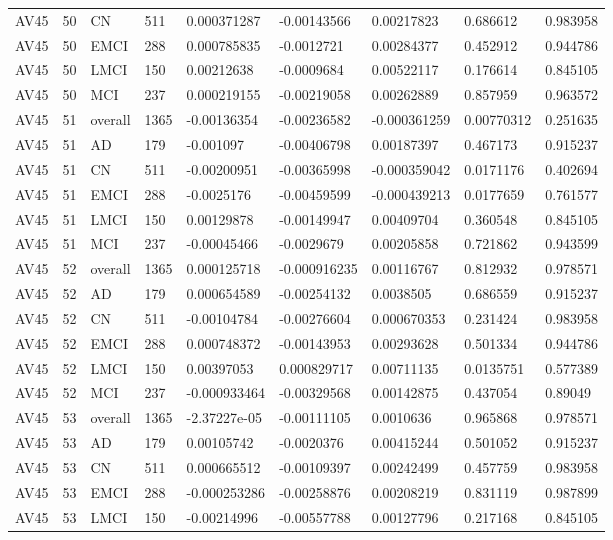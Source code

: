 \begin{landscape}
\begin{longtable}{lllllllll}
AV45 & 50 & CN & 511 & 0.000371287 & -0.00143566 & 0.00217823 & 0.686612 & 0.983958 \\
AV45 & 50 & EMCI & 288 & 0.000785835 & -0.0012721 & 0.00284377 & 0.452912 & 0.944786 \\
AV45 & 50 & LMCI & 150 & 0.00212638 & -0.0009684 & 0.00522117 & 0.176614 & 0.845105 \\
AV45 & 50 & MCI & 237 & 0.000219155 & -0.00219058 & 0.00262889 & 0.857959 & 0.963572 \\
AV45 & 51 & overall & 1365 & -0.00136354 & -0.00236582 & -0.000361259 & 0.00770312 & 0.251635 \\
AV45 & 51 & AD & 179 & -0.001097 & -0.00406798 & 0.00187397 & 0.467173 & 0.915237 \\
AV45 & 51 & CN & 511 & -0.00200951 & -0.00365998 & -0.000359042 & 0.0171176 & 0.402694 \\
AV45 & 51 & EMCI & 288 & -0.0025176 & -0.00459599 & -0.000439213 & 0.0177659 & 0.761577 \\
AV45 & 51 & LMCI & 150 & 0.00129878 & -0.00149947 & 0.00409704 & 0.360548 & 0.845105 \\
AV45 & 51 & MCI & 237 & -0.00045466 & -0.0029679 & 0.00205858 & 0.721862 & 0.943599 \\
AV45 & 52 & overall & 1365 & 0.000125718 & -0.000916235 & 0.00116767 & 0.812932 & 0.978571 \\
AV45 & 52 & AD & 179 & 0.000654589 & -0.00254132 & 0.0038505 & 0.686559 & 0.915237 \\
AV45 & 52 & CN & 511 & -0.00104784 & -0.00276604 & 0.000670353 & 0.231424 & 0.983958 \\
AV45 & 52 & EMCI & 288 & 0.000748372 & -0.00143953 & 0.00293628 & 0.501334 & 0.944786 \\
AV45 & 52 & LMCI & 150 & 0.00397053 & 0.000829717 & 0.00711135 & 0.0135751 & 0.577389 \\
AV45 & 52 & MCI & 237 & -0.000933464 & -0.00329568 & 0.00142875 & 0.437054 & 0.89049 \\
AV45 & 53 & overall & 1365 & -2.37227e-05 & -0.00111105 & 0.0010636 & 0.965868 & 0.978571 \\
AV45 & 53 & AD & 179 & 0.00105742 & -0.0020376 & 0.00415244 & 0.501052 & 0.915237 \\
AV45 & 53 & CN & 511 & 0.000665512 & -0.00109397 & 0.00242499 & 0.457759 & 0.983958 \\
AV45 & 53 & EMCI & 288 & -0.000253286 & -0.00258876 & 0.00208219 & 0.831119 & 0.987899 \\
AV45 & 53 & LMCI & 150 & -0.00214996 & -0.00557788 & 0.00127796 & 0.217168 & 0.845105 \\

\end{longtable}
\end{landscape}
